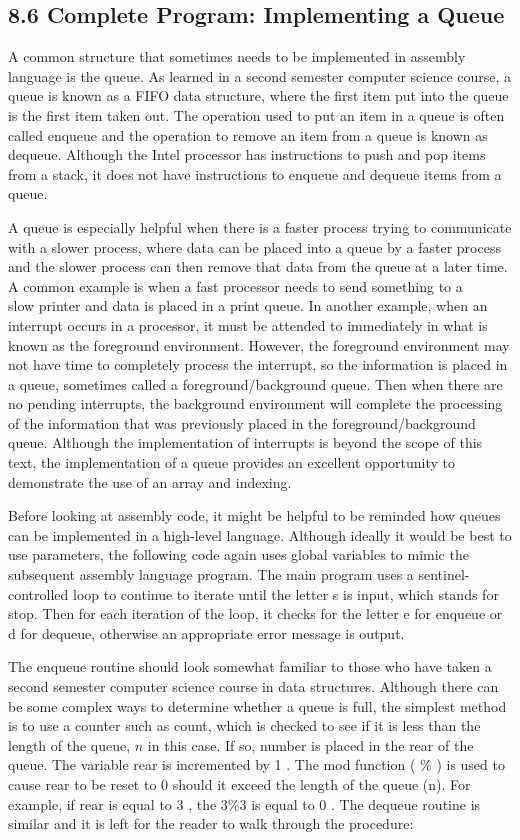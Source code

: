 \documentclass[10pt]{article}
\begin{document}
\subsection*{8.6 Complete Program: Implementing a Queue}
A common structure that sometimes needs to be implemented in assembly language is the queue. As learned in a second semester computer science course, a queue is known as a FIFO data structure, where the first item put into the queue is the first item taken out. The operation used to put an item in a queue is often called enqueue and the operation to remove an item from a queue is known as dequeue. Although the Intel processor has instructions to push and pop items from a stack, it does not have instructions to enqueue and dequeue items from a queue.

A queue is especially helpful when there is a faster process trying to communicate with a slower process, where data can be placed into a queue by a faster process and the slower process can then remove that data from the queue at a later time. A common example is when a fast processor needs to send something to a\\
slow printer and data is placed in a print queue. In another example, when an interrupt occurs in a processor, it must be attended to immediately in what is known as the foreground environment. However, the foreground environment may not have time to completely process the interrupt, so the information is placed in a queue, sometimes called a foreground/background queue. Then when there are no pending interrupts, the background environment will complete the processing of the information that was previously placed in the foreground/background queue. Although the implementation of interrupts is beyond the scope of this text, the implementation of a queue provides an excellent opportunity to demonstrate the use of an array and indexing.

Before looking at assembly code, it might be helpful to be reminded how queues can be implemented in a high-level language. Although ideally it would be best to use parameters, the following code again uses global variables to mimic the subsequent assembly language program. The main program uses a sentinel-controlled loop to continue to iterate until the letter s is input, which stands for stop. Then for each iteration of the loop, it checks for the letter e for enqueue or d for dequeue, otherwise an appropriate error message is output.

The enqueue routine should look somewhat familiar to those who have taken a second semester computer science course in data structures. Although there can be some complex ways to determine whether a queue is full, the simplest method is to use a counter such as count, which is checked to see if it is less than the length of the queue, $n$ in this case. If so, number is placed in the rear of the queue. The variable rear is incremented by 1 . The mod function ( $\%$ ) is used to cause rear to be reset to 0 should it exceed the length of the queue (n). For example, if rear is equal to 3 , the $3 \% 3$ is equal to 0 . The dequeue routine is similar and it is left for the reader to walk through the procedure:
\end{document}

